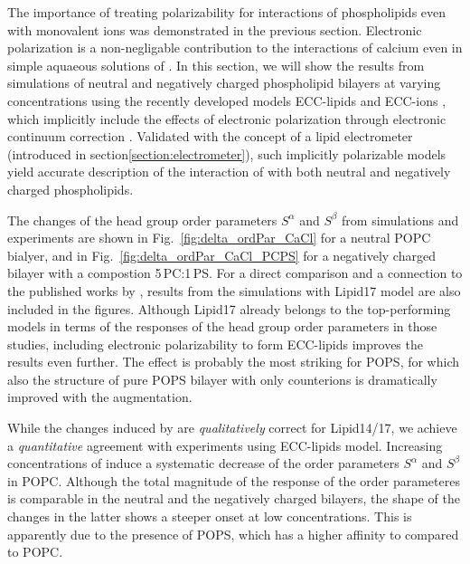 The importance of treating polarizability for interactions of phospholipids even with monovalent ions was demonstrated in the previous section. 
Electronic polarization is a non-negligable contribution to the interactions of calcium even in simple aquaeous solutions of  \citep{martinek17, kohagen16, Pluharova2014}. 
In this section,
we will show the results from simulations of neutral and negatively charged phospholipid bilayers at varying  concentrations
using the recently developed models ECC-lipids and ECC-ions \citep{melcr18, martinek17}, 
which implicitly include the effects of electronic polarization through electronic continuum correction \citep{leontyev11}. 
Validated with the concept of a lipid electrometer (introduced in section\ref{section:electrometer}),
such implicitly polarizable models yield accurate description of 
the interaction of  with both neutral and negatively charged phospholipids. 

The changes of the head group order parameters $S^\alpha$ and $S^\beta$ from simulations and experiments 
are shown in Fig.~\ref{fig:delta_ordPar_CaCl} for a neutral POPC bialyer, 
and in Fig.~\ref{fig:delta_ordPar_CaCl_PCPS} for a negatively charged bilayer with a compostion 5\,PC:1\,PS. 
For a direct comparison and a connection to the published works by \citet{catte16, nmrlipids_proj4},
results from the simulations with Lipid17 model \citep{lipid17-future} are also included in the figures. 
Although Lipid17 already belongs to the top-performing models in terms of the responses of the head group order parameters in those studies,  
including electronic polarizability to form ECC-lipids improves the results even further.
The effect is probably the most striking for POPS, 
for which also the structure of pure POPS bilayer with only counterions is dramatically improved with the augmentation. 


While the changes induced by  are \emph{qualitatively} correct for Lipid14/17, 
we achieve a \emph{quantitative} agreement with experiments using ECC-lipids model. 
Increasing concentrations of  induce a systematic decrease of the order parameters $S^\alpha$ and $S^\beta$ in POPC. 
Although the total magnitude of the response of the order parameteres is comparable in the neutral and the negatively charged bilayers, 
the shape of the changes in the latter shows a steeper onset at low concentrations. 
This is apparently due to the presence of POPS, 
which has a higher affinity to  compared to POPC. 




